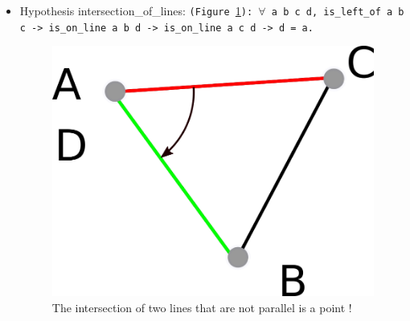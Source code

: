 \documentclass[a4paper,10pt]{article}
\def\hypothesis#1#2{{\color{purple}Hypothesis} {\color{blue}#1}: {\tt #2}}
\begin{document}
\begin{itemize}
       \item \hypothesis{intersection\_of\_lines}{(Figure \ref{intersection_line}):
            $\forall$ a b c d,
is\_left\_of a b c -> is\_on\_line a b d ->
is\_on\_line a c d -> d = a.}
\\\begin{figure}
\centering
\includegraphics[scale=2]{il}
\caption{\label{intersection_line} The intersection of two lines that are not parallel is a point !}
\end{figure}
\end{itemize}
\end{document}
